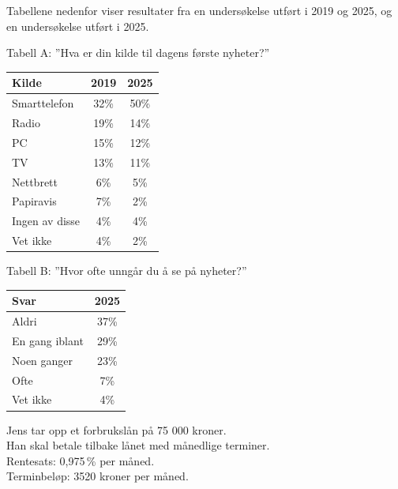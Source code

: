 Tabellene nedenfor viser resultater fra en undersøkelse utført i 2019 og 2025, og en undersøkelse utført i 2025.
\begin{center}
	\small
	\parbox[t][5cm]{0.44\linewidth}{
	Tabell A: ''Hva er din kilde til dagens første nyheter?''
	\begin{tabular}{|l|c|c|}
		\hline
		\rowcolor{Gray!20} Kilde & 2019 & 2025 \\ \hline
		Smarttelefon  & 32\% & 50\% \\ \hline
		Radio         & 19\% & 14\% \\ \hline
		PC            & 15\% & 12\% \\ \hline
		TV            & 13\% & 11\% \\ \hline
		Nettbrett     & 6\%  & 5\%  \\ \hline
		Papiravis     & 7\%  & 2\%  \\ \hline
		Ingen av disse & 4\% & 4\%  \\ \hline
		Vet ikke      & 4\%  & 2\%  \\ \hline
	\end{tabular}
	\vfill
	}
	\parbox[t][5cm]{0.44\linewidth}{
	Tabell B: ''Hvor ofte unngår du å se på nyheter?''
	\begin{tabular}{|l|c|}
		\hline
		\rowcolor{Gray!20}Svar & 2025 \\ \hline
		Aldri           & 37\% \\ \hline
		En gang iblant  & 29\% \\ \hline
		Noen ganger     & 23\% \\ \hline
		Ofte            & 7\%  \\ \hline
		Vet ikke        & 4\%  \\ \hline
	\end{tabular}
	\vfill
	}
\end{center}

Jens tar opp et forbrukslån på 75 000 kroner. \\
Han skal betale tilbake lånet med månedlige terminer.\\
Rentesats: 0,975\,\% per måned. \\
Terminbeløp: 3520 kroner per måned. \os

